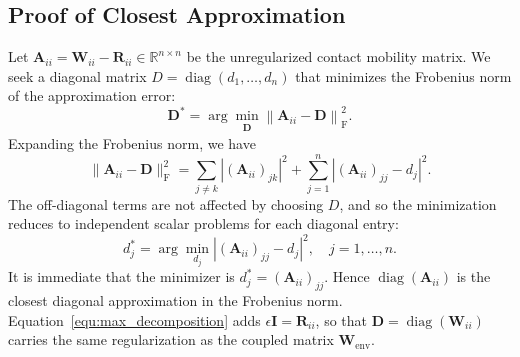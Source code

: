 



\subsection{Proof of Closest Approximation}\label{proof:closest_approximation}
Let $\boldsymbol{A}_{ii}=\boldsymbol{W}_{ii}-\boldsymbol{R}_{ii} \in \mathbb{R}^{n \times n}$ be the unregularized contact mobility matrix. We seek a diagonal matrix $D = \operatorname{diag}(d_1, \dots, d_n)$ 
that minimizes the Frobenius norm of the approximation error:
\begin{equation}
    \boldsymbol{D}^* = \arg \min_{\substack{\boldsymbol{D}}} 
    \left\| \boldsymbol{A}_{ii} - \boldsymbol{D} \right\|_{\mathrm{F}}^2.
\end{equation}
Expanding the Frobenius norm, we have
\begin{equation}
    \| \boldsymbol{A}_{ii} - \boldsymbol{D} \|_\text{F}^2 = \sum_{j \neq k} |(\boldsymbol{A}_{ii})_{jk}|^2 + \sum_{j=1}^{n} |(\boldsymbol{A}_{ii})_{jj} - d_j|^2.
\end{equation}
The off-diagonal terms are not affected by choosing $D$, and so the minimization reduces to independent scalar problems for each diagonal entry:
\begin{equation}
d_j^* = \arg \min_{d_j} |(\boldsymbol{A}_{ii})_{jj} - d_j|^2, \quad j = 1, \dots, n.
\end{equation}
It is immediate that the minimizer is $d_j^* = (\boldsymbol{A}_{ii})_{jj}$. 
Hence $\operatorname{diag}(\boldsymbol{A}_{ii})$ is the closest diagonal approximation in the Frobenius norm. Equation~\eqref{equ:max_decomposition} adds $\epsilon\boldsymbol{I}=\boldsymbol{R}_{ii}$, so that $\boldsymbol{D}=\operatorname{diag}(\boldsymbol{W}_{ii})$ carries the same regularization as the coupled matrix $\boldsymbol{W}_{\mathrm{env}}$.
